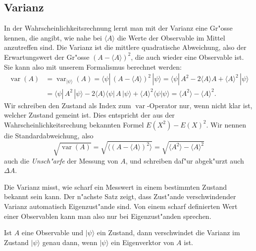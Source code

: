 \subsection{Varianz}
In der Wahrscheinlichkeitsrechnung lernt man mit der Varianz eine
Gr"osse kennen, die angibt, wie nahe bei $\langle A\rangle$ die
Werte der Observable im Mittel anzutreffen sind.
Die Varianz ist die mittlere quadratische Abweichung, also der
Erwartungswert der Gr"osse $(A-\langle A\rangle)^2$, die auch wieder
eine Observable ist. Sie kann also mit unserem Formalismus berechnet
werden:
\begin{align*}
\operatorname{var}(A)
&=
\operatorname{var}_{|\psi\rangle}(A)
=
\langle \psi|\, (A-\langle A\rangle)^2\,|\psi\rangle
=
\langle\psi|\, A^2-2\langle A\rangle A+\langle A\rangle^2\,|\psi\rangle
\\
&=
\langle\psi|\,A^2\,|\psi\rangle 
-2\langle A\rangle \langle\psi|\,A\,|\psi\rangle
+\langle A\rangle^2\langle\psi|\psi\rangle
=\langle A^2\rangle -\langle A\rangle^2.
\end{align*}
Wir schreiben den Zustand als Index zum $\operatorname{var}$-Operator
nur, wenn nicht klar ist, welcher Zustand gemeint ist.
Dies entspricht der aus der Wahrscheinlichkeitsrechung bekannten Formel
$E(X^2)-E(X)^2$.
Wir nennen die Standardabweichung, also
\[
\sqrt{\operatorname{var}(A)}
=
\sqrt{\langle (A-\langle A\rangle)^2\rangle}
=
\sqrt{\langle A^2\rangle - \langle A\rangle^2}
\]
auch die {\em Unsch"arfe} der Messung von $A$, und schreiben daf"ur abgek"urzt
auch $\Delta A$.

Die Varianz misst, wie scharf ein Messwert in einem bestimmten Zustand
bekannt sein kann.
Der n"achste Satz zeigt, dass Zust"ande verschwindender Varianz
automatisch Eigenzust"ande sind. 
Von einem scharf definierten Wert einer Observablen kann man also nur
bei Eigenzust"anden sprechen.

\begin{satz}
Ist $A$ eine Observable und $|\psi\rangle$ ein Zustand, dann verschwindet
die Varianz im Zustand $|\psi\rangle$ genau dann, wenn $|\psi\rangle$
ein Eigenverktor von $A$ ist.
\end{satz}

